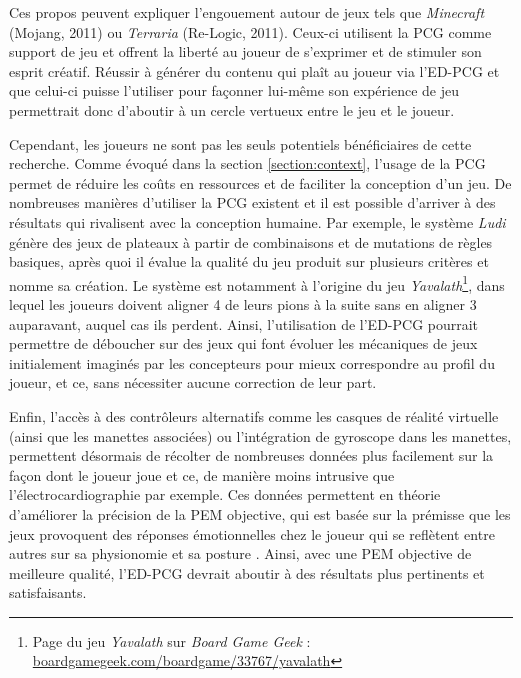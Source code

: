 \documentclass[a4paper,11pt]{article}
\begin{document}
      Ces propos peuvent expliquer l'engouement autour de jeux tels que \textit{Minecraft} (Mojang, 2011) ou \textit{Terraria} (Re-Logic, 2011).
      Ceux-ci utilisent la PCG comme support de jeu et offrent la liberté au joueur de s'exprimer et de stimuler son esprit créatif.
      Réussir à générer du contenu qui plaît au joueur via l'ED-PCG et que celui-ci puisse l'utiliser pour façonner lui-même son expérience de jeu permettrait donc d'aboutir à un cercle vertueux entre le jeu et le joueur.

      Cependant, les joueurs ne sont pas les seuls potentiels bénéficiaires de cette recherche.
      Comme évoqué dans la section \ref{section:context}, l'usage de la PCG permet de réduire les coûts en ressources et de faciliter la conception d'un jeu.
      De nombreuses manières d'utiliser la PCG existent \cite{Craveirinha} et il est possible d'arriver à des résultats qui rivalisent avec la conception humaine.
      Par exemple, le système \textit{Ludi} \cite{Browne} génère des jeux de plateaux à partir de combinaisons et de mutations de règles basiques, après quoi il évalue la qualité du jeu produit sur plusieurs critères et nomme sa création.
      Le système est notamment à l'origine du jeu \textit{Yavalath}\footnote{Page du jeu \textit{Yavalath} sur \textit{Board Game Geek} : \url{boardgamegeek.com/boardgame/33767/yavalath}}, dans lequel les joueurs doivent aligner 4 de leurs pions à la suite sans en aligner 3 auparavant, auquel cas ils perdent.
      Ainsi, l'utilisation de l'ED-PCG pourrait permettre de déboucher sur des jeux qui font évoluer les mécaniques de jeux initialement imaginés par les concepteurs pour mieux correspondre au profil du joueur, et ce, sans nécessiter aucune correction de leur part.

      Enfin, l'accès à des contrôleurs alternatifs comme les casques de réalité virtuelle (ainsi que les manettes associées) ou l'intégration de gyroscope dans les manettes, permettent désormais de récolter de nombreuses données plus facilement sur la façon dont le joueur joue et ce, de manière moins intrusive que l'électrocardiographie par exemple.
      Ces données permettent en théorie d'améliorer la précision de la PEM objective, qui est basée sur la prémisse que les jeux provoquent des réponses émotionnelles chez le joueur qui se reflètent entre autres sur sa physionomie et sa posture \cite{Yannakakis}.
      Ainsi, avec une PEM objective de meilleure qualité, l'ED-PCG devrait aboutir à des résultats plus pertinents et satisfaisants.
      
\end{document}
